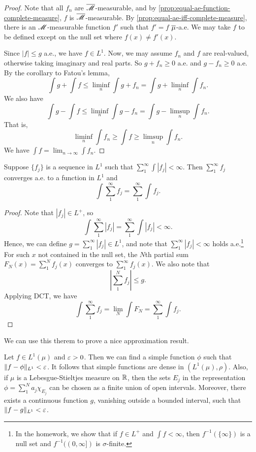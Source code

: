 \documentclass[12pt]{article} %
\begin{document}
\begin{proof}
    Note that all $f_n$ are $\overline{\mathscr{M}}$-measurable, and by 
    \cref{prop:equal-ae-function-complete-measure}, $f$ is $\overline{\mathscr{M}}$-measurable. By \cref{prop:equal-ae-iff-complete-measure}, there is an $\mathscr{M}$-measurable function $f'$ such that $f' = f$ $\overline{\mu}$-a.e. We may take $f$ to be defined except on the null set where $f(x) \neq f'(x)$.
    
    Since $|f| \leq g$ a.e., we have $f \in L^1$. Now, we may assume $f_n$ and $f$ are real-valued, otherwise taking imaginary and real parts. So $g + f_n \geq 0$ a.e. and $g - f_n \geq 0$ a.e. By the corollary to Fatou's lemma, \[\int g + \int f \leq \liminf_n \int g + f_n = \int g + \liminf_n \int f_n.\] We also have \[\int g - \int f \leq \liminf_n \int g - f_n = \int g - \limsup_n \int f_n.\] That is, \[\liminf_n \int f_n \geq \int f \geq \limsup_n \int f_n.\] We have $\int f = \lim_{n \to \infty} \int f_n$.
\end{proof}

\begin{theorem}
    Suppose $\{f_j\}$ is a sequence in $L^1$ such that $\sum_1^\infty \int |f_j| < \infty$. Then $\sum_1^\infty f_j$ converges a.e. to a function in $L^1$ and \[\int \sum_1^\infty f_j = \sum_1^\infty \int f_j.\]
\end{theorem}

\begin{proof}
    Note that $|f_j| \in L^+$, so \[\int \sum_1^\infty |f_j| = \sum_1^\infty \int |f_j| < \infty.\] Hence, we can define $g = \sum_1^\infty |f_j| \in L^1$, and note that $\sum_1^\infty |f_j| < \infty$ holds a.e.\footnote{In the homework, we show that if $f \in L^+$ and $\int f < \infty$, then $f^{-1}(\{\infty\})$ is a null set and $f^{-1}((0, \infty])$ is $\sigma$-finite.} For such $x$ not contained in the null set, the $N$th partial sum $F_N(x) = \sum_1^N f_j(x)$ converges to $\sum_1^\infty f_j(x)$. We also note that \[\left|\sum_1^N f_j \right| \leq g.\] Applying DCT, we have \[\int \sum_1^\infty f_j = \lim_N \int F_N = \sum_1^\infty \int f_j.\]
\end{proof}

We can use this therem to prove a nice approximation result.

\begin{theorem}\label{thm:2.26}
    Let $f \in L^1(\mu)$ and $\varepsilon > 0$. Then we can find a simple function $\phi$ such that $\|f - \phi\|_{L^1} < \varepsilon$. It follows that simple functions are dense in $(L^1(\mu), \rho)$. Also, if $\mu$ is a Lebesgue-Stieltjes measure on $\mathbb{R}$, then the sets $E_j$ in the representation $\phi = \sum_1^N a_j \chi_{E_j}$ can be chosen as a finite union of open intervals. Moreover, there exists a continuous function $g$, vanishing outside a bounded interval, such that $\|f - g\|_{L^1} < \varepsilon$.
\end{theorem}
\end{document}
